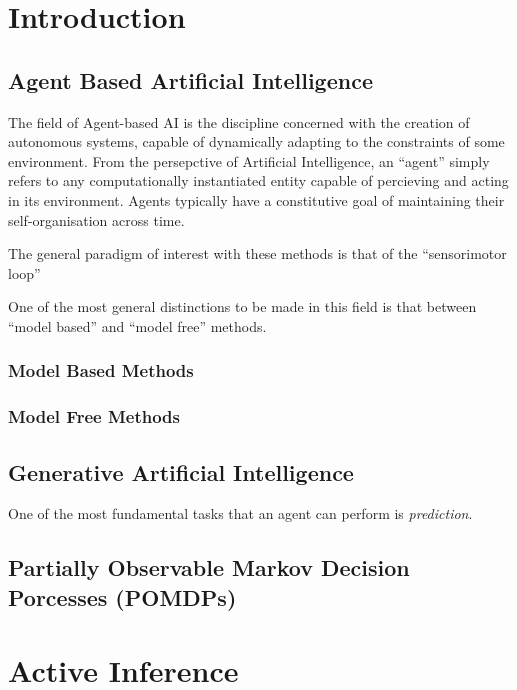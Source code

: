 \documentclass[onecolumn]{IEEEtran}
\begin{document}
\section{Introduction}

\subsection{Agent Based Artificial Intelligence}
The field of Agent-based AI is the discipline concerned with the creation of autonomous systems, capable of dynamically adapting to the constraints of some environment. From the persepctive of Artificial Intelligence, an ``agent'' simply refers to any computationally instantiated entity capable of percieving and acting in its environment. Agents typically have a constitutive goal of maintaining their self-organisation across time.  

The general paradigm of interest with these methods is that of the ``sensorimotor loop''

One of the most general distinctions to be made in this field is that between ``model based'' and ``model free'' methods. 

\vspace{12pt}
\subsubsection{Model Based Methods}

\vspace{12pt}
\subsubsection{Model Free Methods}

\subsection{Generative Artificial Intelligence}
One of the most fundamental tasks that an agent can perform is \textit{prediction}.

\subsection{Partially Observable Markov Decision Porcesses (POMDPs)}

\section{Active Inference}
\end{document}
